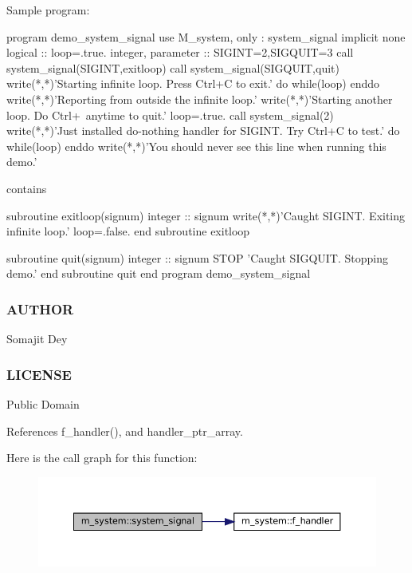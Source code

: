 \begin{DoxyVerb}Sample program:

 program demo_system_signal
 use M_system, only : system_signal
 implicit none
 logical :: loop=.true.
 integer, parameter :: SIGINT=2,SIGQUIT=3
 call system_signal(SIGINT,exitloop)
 call system_signal(SIGQUIT,quit)
 write(*,*)'Starting infinite loop. Press Ctrl+C to exit.'
 do while(loop)
 enddo
 write(*,*)'Reporting from outside the infinite loop.'
 write(*,*)'Starting another loop. Do Ctrl+\ anytime to quit.'
 loop=.true.
 call system_signal(2)
 write(*,*)'Just installed do-nothing handler for SIGINT. Try Ctrl+C to test.'
 do while(loop)
 enddo
 write(*,*)'You should never see this line when running this demo.'

 contains

 subroutine exitloop(signum)
   integer :: signum
   write(*,*)'Caught SIGINT. Exiting infinite loop.'
   loop=.false.
 end subroutine exitloop

 subroutine quit(signum)
   integer :: signum
   STOP 'Caught SIGQUIT. Stopping demo.'
 end subroutine quit
 end program demo_system_signal
\end{DoxyVerb}


\subsubsection*{A\+U\+T\+H\+OR}

Somajit Dey

\subsubsection*{L\+I\+C\+E\+N\+SE}

Public Domain 

References f\+\_\+handler(), and handler\+\_\+ptr\+\_\+array.

Here is the call graph for this function\+:\nopagebreak
\begin{figure}[H]
\begin{center}
\leavevmode
\includegraphics[width=350pt]{namespacem__system_a4a70cade424b9763dedd8cb8c0059e8c_cgraph}
\end{center}
\end{figure}
\mbox{\label{namespacem__system_a5bb1ebcebe181e07fd24e908cacc9887}} 
